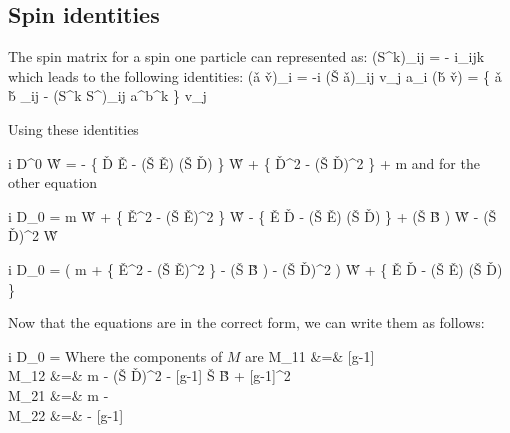 \subsection{Spin identities}

The spin matrix for a spin one particle can represented as:
\beq
	(S^k)_{ij} = - i\epsilon_{ijk}
\eeq
which leads to the following identities:
\beq
	(\v{a} \times \v{v})_i = -i (\v{S} \cdot \v{a})_{ij} v_j
\eeq
\beq
	a_i (\v{b} \cdot \v{v}) = \{ \v{a} \cdot \v{b} \; \delta_{ij} - (S^k S^\ell)_{ij} a^\ell b^k \} v_j
\eeq

Using these identities


\beq
	i D^0 \v{W} = 
		- \{ \v{D} \cdot \v{E} - (\v{S} \cdot \v{E}) (\v{S} \cdot \v{D})	\} \v{W}
		+ \{ \v{D}^2 -  (\v{S} \cdot \v{D})^2 \} \gv{\eta} + m \gv{\eta}
\eeq
and for the other equation

\beq
	i D_0 \gv{\eta} = m \v{W} 
			+  \{ \v{E}^2 - (\v{S} \cdot \v{E})^2 \} \v{W}
			- \{ \v{E} \cdot \v{D} - (\v{S} \cdot \v{E}) (\v{S} \cdot \v{D}) \} \gv{\eta}
			+  (\v{S} \cdot \v{B} ) \v{W}
			 -  (\v{S} \cdot \v{D})^2  \v{W}  
\eeq

\beq
	i D_0 \gv{\eta} = \left(
				m 
				+  \{ \v{E}^2 - (\v{S} \cdot \v{E})^2 \} 
				-  (\v{S} \cdot \v{B} )
				-  (\v{S} \cdot \v{D})^2 
			\right ) \v{W} 
			+ \{ \v{E} \cdot \v{D} - (\v{S} \cdot \v{E}) (\v{S} \cdot \v{D}) \} \gv{\eta}  
\eeq

Now that the equations are in the correct form, we can write them as follows:



\beq \label{eq:S1:M}
	i D_0  = 
\eeq
Where the components of $M$ are
\beqa
M_{11} &=&  [g-1]   	\\
M_{12}	&=&		m
	- (\v{S} \cdot \v{D})^2 
	- [g-1]  \v{S} \cdot \v{B}
	+ [g-1]^2    	\\
M_{21} &=& 
	 m	- 		\\
M_{22} &=&  
	 - [g-1]     
\eeqa

